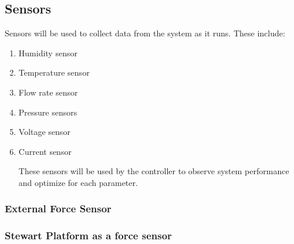 \subsection{ Sensors}
Sensors will be used to collect data from the system as it runs. These include:
\begin{enumerate}
	\item Humidity sensor
	\item Temperature sensor
	\item Flow rate sensor
	\item Pressure sensors
	\item Voltage sensor
	\item Current sensor
	
	These sensors will be used by the controller to observe system performance and optimize for each parameter.
\end{enumerate}


\subsubsection{External Force Sensor}

\subsubsection{Stewart Platform as a force sensor}
